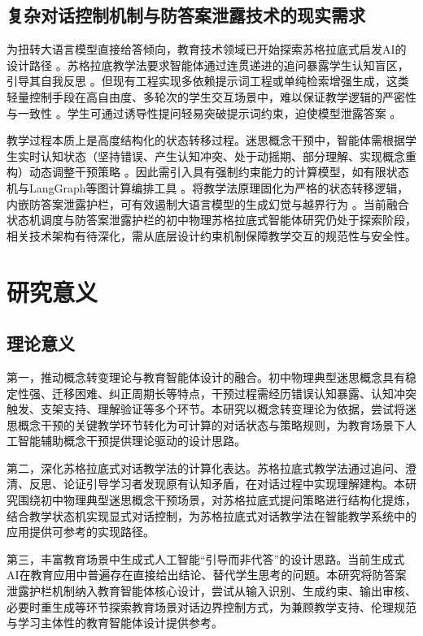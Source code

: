 \subsection{复杂对话控制机制与防答案泄露技术的现实需求}

为扭转大语言模型直接给答倾向，教育技术领域已开始探索苏格拉底式启发AI的设计路径 \citep{ref22}。苏格拉底教学法要求智能体通过连贯递进的追问暴露学生认知盲区，引导其自我反思 \citep{ref24}。但现有工程实现多依赖提示词工程或单纯检索增强生成，这类轻量控制手段在高自由度、多轮次的学生交互场景中，难以保证教学逻辑的严密性与一致性 \citep{ref20}。学生可通过诱导性提问轻易突破提示词约束，迫使模型泄露答案 \citep{ref26}。

教学过程本质上是高度结构化的状态转移过程。迷思概念干预中，智能体需根据学生实时认知状态（坚持错误、产生认知冲突、处于动摇期、部分理解、实现概念重构）动态调整干预策略 \citep{ref30}。因此需引入具有强制约束能力的计算模型，如有限状态机与LangGraph等图计算编排工具 \citep{ref32}。将教学法原理固化为严格的状态转移逻辑，内嵌防答案泄露护栏，可有效遏制大语言模型的生成幻觉与越界行为 \citep{ref20}。当前融合状态机调度与防答案泄露护栏的初中物理苏格拉底式智能体研究仍处于探索阶段，相关技术架构有待深化，需从底层设计约束机制保障教学交互的规范性与安全性。

\section{研究意义}

\subsection{理论意义}

第一，推动概念转变理论与教育智能体设计的融合。初中物理典型迷思概念具有稳定性强、迁移困难、纠正周期长等特点，干预过程需经历错误认知暴露、认知冲突触发、支架支持、理解验证等多个环节。本研究以概念转变理论为依据，尝试将迷思概念干预的关键教学环节转化为可计算的对话状态与策略规则，为教育场景下人工智能辅助概念干预提供理论驱动的设计思路。

第二，深化苏格拉底式对话教学法的计算化表达。苏格拉底式教学法通过追问、澄清、反思、论证引导学习者发现原有认知矛盾，在对话过程中实现理解建构。本研究围绕初中物理典型迷思概念干预场景，对苏格拉底式提问策略进行结构化提炼，结合教学状态机实现显式对话控制，为苏格拉底式对话教学法在智能教学系统中的应用提供可参考的实现路径。

第三，丰富教育场景中生成式人工智能“引导而非代答”的设计思路。当前生成式AI在教育应用中普遍存在直接给出结论、替代学生思考的问题。本研究将防答案泄露护栏机制纳入教育智能体核心设计，尝试从输入识别、生成约束、输出审核、必要时重生成等环节探索教育场景对话边界控制方式，为兼顾教学支持、伦理规范与学习主体性的教育智能体设计提供参考。

